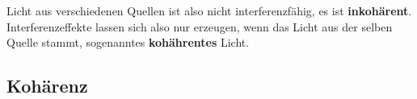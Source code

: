 Licht aus verschiedenen Quellen ist also nicht interferenzfähig, es ist \textbf{inkohärent}.
Interferenzeffekte lassen sich also nur erzeugen, wenn das Licht aus der selben Quelle stammt, 
sogenanntes \textbf{kohährentes} Licht.


\subsection{Kohärenz}
\label{sec:kohärenz} 










\cite{Anleitung}
